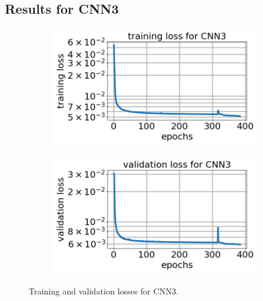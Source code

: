 \documentclass[12pt]{article}
\newcommand{\nhglossheight}{4cm}
\newcommand{\nhglosswidth}{0.48\linewidth}
\begin{document}
\subsection{\label{sect:resultscnn3}Results for CNN3}
\begin{figure}[!h]
  \centering
  \begin{subfigure}[c]{\nhglosswidth}
    \centering
    \includegraphics[totalheight=\nhglossheight]{Figures/Results3New/loss_cnn3_new.png}
  \end{subfigure}
%  
  \begin{subfigure}[c]{\nhglosswidth}
    \centering
    \includegraphics[totalheight=\nhglossheight]{Figures/Results3New/val_loss_cnn3_new.png}
  \end{subfigure}
  \caption{\label{fig:cnn3losses} Training and validation losses for CNN3.}
\end{figure}
%
\end{document}
